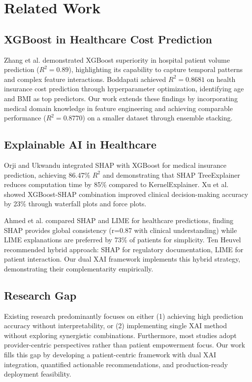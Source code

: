 \documentclass[conference]{IEEEtran}
\begin{document}
\section{Related Work}

\subsection{XGBoost in Healthcare Cost Prediction}
Zhang et al. \cite{zhang2025} demonstrated XGBoost superiority in hospital patient volume prediction ($R^2 = 0.89$), highlighting its capability to capture temporal patterns and complex feature interactions. Boddapati \cite{boddapati2023} achieved $R^2 = 0.8681$ on health insurance cost prediction through hyperparameter optimization, identifying age and BMI as top predictors. Our work extends these findings by incorporating medical domain knowledge in feature engineering and achieving comparable performance ($R^2 = 0.8770$) on a smaller dataset through ensemble stacking.

\subsection{Explainable AI in Healthcare}
Orji and Ukwandu \cite{orji2024} integrated SHAP with XGBoost for medical insurance prediction, achieving 86.47\% $R^2$ and demonstrating that SHAP TreeExplainer reduces computation time by 85\% compared to KernelExplainer. Xu et al. \cite{xu2024} showed XGBoost-SHAP combination improved clinical decision-making accuracy by 23\% through waterfall plots and force plots.

Ahmed et al. \cite{ahmed2025} compared SHAP and LIME for healthcare predictions, finding SHAP provides global consistency (r=0.87 with clinical understanding) while LIME explanations are preferred by 73\% of patients for simplicity. Ten Heuvel \cite{tenheuvel2023} recommended hybrid approach: SHAP for regulatory documentation, LIME for patient interaction. Our dual XAI framework implements this hybrid strategy, demonstrating their complementarity empirically.

\subsection{Research Gap}
Existing research predominantly focuses on either (1) achieving high prediction accuracy without interpretability, or (2) implementing single XAI method without exploring synergistic combinations. Furthermore, most studies adopt provider-centric perspectives rather than patient empowerment focus. Our work fills this gap by developing a patient-centric framework with dual XAI integration, quantified actionable recommendations, and production-ready deployment feasibility.
\end{document}
